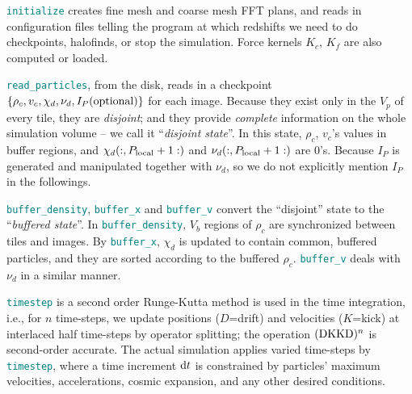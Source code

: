 \documentclass[10pt,twocolumn,reprint]{emulateapj}
\newcommand{\tcx}{\textcolor{teal}}
\begin{document}
{\tt \tcx{initialize}} creates fine mesh and coarse mesh FFT plans, and reads in configuration files telling the program at which redshifts we need to do checkpoints, halofinds, or stop the simulation. Force kernels $K_c$, $K_f$ are also computed or loaded.

{\tt \tcx{read\_particles}}, from the disk, reads in a checkpoint $\{\rho_c,v_c,\chi_d,\nu_d,I_P({\rm optional})\}$ for each image. Because they exist only in the $V_p$ of every tile, they are {\it disjoint}; and they provide {\it complete} information on the whole simulation volume -- we call it ``{\it disjoint state}''. In this state, $\rho_c$, $v_c$'s values in buffer regions, and $\chi_d(:,P_{\rm local}+1:)$ and $\nu_d(:,P_{\rm local}+1:)$ are 0's. Because $I_P$ is generated and manipulated together with $\nu_d$, so we do not explicitly mention $I_P$ in the followings.

{\tt \tcx{buffer\_density}}, {\tt \tcx{buffer\_x}} and {\tt \tcx{buffer\_v}} convert the ``disjoint'' state to the ``{\it buffered state}''. In {\tt \tcx{buffer\_density}}, $V_b$ regions of $\rho_c$ are synchronized between tiles and images. By {\tt \tcx{buffer\_x}}, $\chi_d$ is updated to contain common, buffered particles, and they are sorted according to the buffered $\rho_c$. {\tt \tcx{buffer\_v}} deals with $\nu_d$ in a similar manner.

{\tt \tcx{timestep}} is
a second order Runge-Kutta method is used in the time integration, i.e., for $n$ time-steps, we update positions ($D$=drift) and velocities ($K$=kick) at interlaced half time-steps by operator splitting; the operation $({\rm DKKD})^n$ is second-order accurate. The actual simulation applies varied time-steps by {\tt \tcx{timestep}}, where a time increment ${\rm d}t$ is constrained by particles' maximum velocities, accelerations, cosmic expansion, and any other desired conditions.
\end{document}
